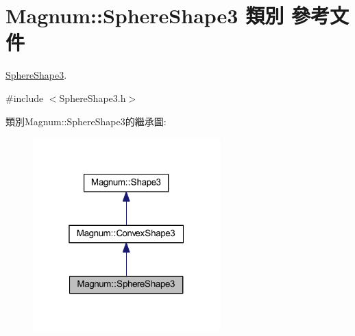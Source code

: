 \hypertarget{class_magnum_1_1_sphere_shape3}{}\section{Magnum\+:\+:Sphere\+Shape3 類別 參考文件}
\label{class_magnum_1_1_sphere_shape3}


\hyperlink{class_magnum_1_1_sphere_shape3}{Sphere\+Shape3}.  




{\ttfamily \#include $<$Sphere\+Shape3.\+h$>$}



類別\+Magnum\+:\+:Sphere\+Shape3的繼承圖\+:\nopagebreak
\begin{figure}[H]
\begin{center}
\leavevmode
\includegraphics[width=205pt]{class_magnum_1_1_sphere_shape3__inherit__graph}
\end{center}
\end{figure}


